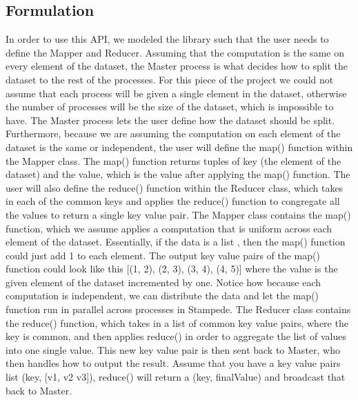 \documentclass[11pt]{article}
\begin{document}
\subsection{Formulation}
In order to use this API, we modeled the library such that the user needs to define the Mapper and Reducer. Assuming that the computation is the same on every element of the dataset, the Master process is what decides how to split the dataset to the rest of the processes. For this piece of the project we could not assume that each process will be given a single element in the dataset, otherwise the number of processes will be the size of the dataset, which is impossible to have. 
\newline 
\indent The Master process lets the user define how the dataset should be split. Furthermore, because we are assuming the computation on each element of the dataset is the same or independent, the user will define the map() function within the Mapper class. The map() function returns tuples of key (the element of the dataset) and the value, which is the value after applying the map() function. The user will also define the reduce() function within the Reducer class, which takes in each of the common keys and applies the reduce() function to congregate all the values to return a single key value pair.
\newline
\indent The Mapper class contains the map() function, which we assume applies a computation that is uniform across each element of the dataset. Essentially, if the data is a list \newline [1, 2, 3, 4], then the map() function could just add 1 to each element. The output key value pairs of the map() function could look like this [(1, 2), (2, 3), (3, 4), (4, 5)] where the value is the given element of the dataset incremented by one. Notice how because each computation is independent, we can distribute the data and let the map() function run in parallel across processes in Stampede.
\newline
\indent
The Reducer class contains the reduce() function, which takes in a list of common key value pairs, where the key is common, and then applies reduce() in order to aggregate the list of values into one single value. This new key value pair is then sent back to Master, who then handles how to output the result. Assume that you have a key value pairs list (key, [v1, v2 v3]), reduce() will return a (key, finalValue) and broadcast that back to Master.
\end{document}
